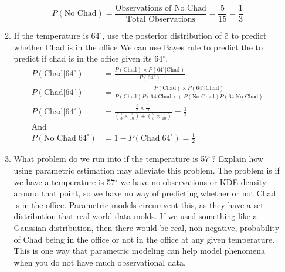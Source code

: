 \documentclass[12pt,twoside]{article}
\newcommand{\rnd}{\Tilde}
\newcommand{\rC}{\rnd{ c}  }
\begin{document}
\begin{enumerate}
\begin{enumerate}
    $$P(\text{No Chad}) =  \frac{\text{Observations of No Chad}}{\text{Total Observations}} = \frac{5}{15} = \frac{1}{3}
$$
\item If the temperature is 64$^{\circ}$, use the posterior distribution of $\rC$ to predict whether Chad is in the office
\subitem We can use Bayes rule to predict the to predict if chad is in the office given its 64$^{\circ}$.
\begin{equation}
    \begin{split}
        P(\text{Chad}|64^{\circ}) &= \frac{P(\text{Chad}) \times P(64^{\circ}|\text{Chad})}{P(64^{\circ})} \\
        P(\text{Chad}|64^{\circ})  &= \frac{P(\text{Chad}) \times P(64^{\circ}|\text{Chad})}{P(\text{Chad})P(64|\text{Chad}) + P(\text{No Chad})P(64|\text{No Chad})} \\
        P(\text{Chad}|64^{\circ})  &= \frac{\frac{2}{3}\times \frac{1}{10}}{(\frac{1}{3}\times \frac{2}{10}) + (\frac{2}{3}\times \frac{1}{10})} = \frac{1}{2} \\
        \text{And} & \\
        P(\text{No Chad}|64^{\circ}) &= 1 - P(\text{Chad}|64^{\circ}) = \frac{1}{2}
    \end{split}
\end{equation}
    

\item What problem do we run into if the temperature is 57$^{\circ}$? Explain how using parametric estimation may alleviate this problem.
\subitem The problem is if we have a temperature is 57$^{\circ}$ we have no observations or KDE density around that point, so we have no way of predicting whether or not Chad is in the office. Parametric models circumvent this, as they have a set distribution that real world data molds. If we used something like a Gaussian distribution, then there would be real, non negative, probability of Chad being in the office or not in the office at any given temperature. This is one way that parametric modeling can help model phenomena when you do not have much observational data.

\end{enumerate}


\end{enumerate}
\end{document}
